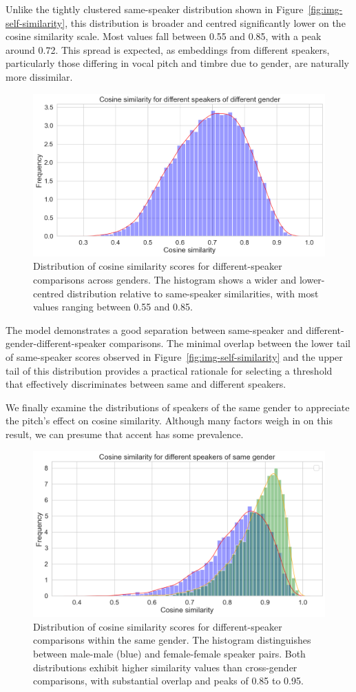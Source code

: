 \documentclass[conference]{IEEEtran}
\begin{document}
	Unlike the tightly clustered same-speaker distribution shown in Figure~\ref{fig:img-self-similarity}, this distribution is broader and centred significantly lower on the cosine similarity scale. Most values fall between 0.55 and 0.85, with a peak around 0.72. This spread is expected, as embeddings from different speakers, particularly those differing in vocal pitch and timbre due to gender, are naturally more dissimilar.
	
	\begin{figure}[H]
		\centering
		\includegraphics[width=0.7\linewidth]{img/img-similarity}
		\caption{Distribution of cosine similarity scores for different-speaker comparisons across genders. The histogram shows a wider and lower-centred distribution relative to same-speaker similarities, with most values ranging between 0.55 and 0.85.}
		\label{fig:img-similarity}
	\end{figure}
	
	The model demonstrates a good separation between same-speaker and different-gender-different-speaker comparisons. The minimal overlap between the lower tail of same-speaker scores observed in Figure~\ref{fig:img-self-similarity} and the upper tail of this distribution provides a practical rationale for selecting a threshold that effectively discriminates between same and different speakers.
	
	We finally examine the distributions of speakers of the same gender to appreciate the pitch's effect on cosine similarity. Although many factors weigh in on this result, we can presume that accent has some prevalence.
	
	\begin{figure}[H]
		\centering
		\includegraphics[width=0.7\linewidth]{img/img-similarity-same-gender}
		\caption{Distribution of cosine similarity scores for different-speaker comparisons within the same gender. The histogram distinguishes between male-male (blue) and female-female speaker pairs. Both distributions exhibit higher similarity values than cross-gender comparisons, with substantial overlap and peaks of 0.85 to 0.95.}	
		\label{fig:img-similarity-same-gender}
	\end{figure}
	
\end{document}
